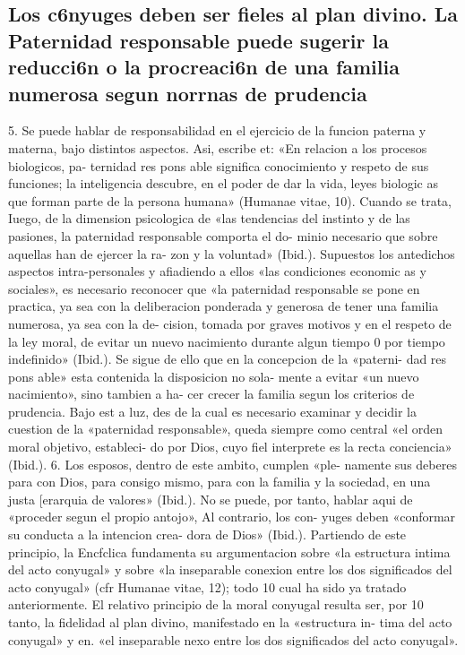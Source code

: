 \documentclass[letterpaper]{report}
\begin{document}
		\subsection{Los c6nyuges deben ser fieles al plan divino. 
		La Paternidad responsable puede sugerir la reducci6n 
		o la procreaci6n de una familia numerosa segun norrnas de prudencia}
			5. Se puede hablar de responsabilidad en el ejercicio 
			de la funcion paterna y materna, bajo distintos aspectos. 
			Asi, escribe et: «En relacion a los procesos biologicos, pa- 
			ternidad res pons able significa conocimiento y respeto de 
			sus funciones; la inteligencia descubre, en el poder de dar 
			la vida, leyes biologic as que forman parte de la persona 
			humana» (Humanae vitae, 10). Cuando se trata, Iuego, de 
			la dimension psicologica de «las tendencias del instinto y 
			de las pasiones, la paternidad responsable comporta el do- 
			minio necesario que sobre aquellas han de ejercer la ra- 
			zon y la voluntad» (Ibid.).
			Supuestos los antedichos aspectos intra-personales y 
			afiadiendo a ellos «las condiciones economic as y sociales», 
			es necesario reconocer que «la paternidad responsable se 
			pone en practica, ya sea con la deliberacion ponderada y 
			generosa de tener una familia numerosa, ya sea con la de- 
			cision, tomada por graves motivos y en el respeto de la 
			ley moral, de evitar un nuevo nacimiento durante algun 
			tiempo 0 por tiempo indefinido» (Ibid.). 
			Se sigue de ello que en la concepcion de la «paterni- 
			dad res pons able» esta contenida la disposicion no sola- 
			mente a evitar «un nuevo nacimiento», sino tambien a ha- 
			cer crecer la familia segun los criterios de prudencia. 
			Bajo est a luz, des de la cual es necesario examinar y 
			decidir la cuestion de la «paternidad responsable», queda 
			siempre como central «el orden moral objetivo, estableci- 
			do por Dios, cuyo fiel interprete es la recta conciencia» 
			(Ibid.).
			6. Los esposos, dentro de este ambito, cumplen «ple- 
			namente sus deberes para con Dios, para consigo mismo, 
			para con la familia y la sociedad, en una justa [erarquia de 
			valores» (Ibid.). No se puede, por tanto, hablar aqui de 
			«proceder segun el propio antojo», Al contrario, los con- 
			yuges deben «conformar su conducta a la intencion crea- 
			dora de Dios» (Ibid.).
			Partiendo de este principio, la Encfclica fundamenta 
			su argumentacion sobre «la estructura intima del acto 
			conyugal» y sobre «la inseparable conexion entre los dos 
			significados del acto conyugal» (cfr Humanae vitae, 12); 
			todo 10 cual ha sido ya tratado anteriormente. El relativo 
			principio de la moral conyugal resulta ser, por 10 tanto, la 
			fidelidad al plan divino, manifestado en la «estructura in- 
			tima del acto conyugal» y en. «el inseparable nexo entre 
			los dos significados del acto conyugal».		
		
\end{document}
